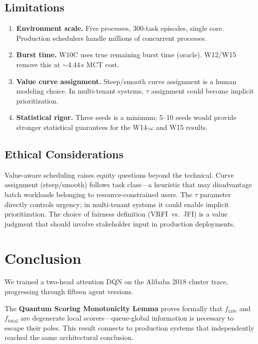 \documentclass[10pt,twocolumn]{article}
\theoremstyle{remark}
\newcommand{\vrfi}{\textsc{VRFI}}
\begin{document}
\subsection{Limitations}

\begin{enumerate}[itemsep=2pt]
\item \textbf{Environment scale.} Five processes, 300-task episodes,
  single core. Production schedulers handle millions of concurrent
  processes.
\item \textbf{Burst time.} W10C uses true remaining burst time
  (oracle). W12/W15 remove this at $\sim$4.44\,s MCT cost.
\item \textbf{Value curve assignment.} Steep/smooth curve assignment
  is a human modeling choice. In multi-tenant systems, $\tau$
  assignment could become implicit prioritization.
\item \textbf{Statistical rigor.} Three seeds is a minimum; 5--10
  seeds would provide stronger statistical guarantees for the W14-$\omega$
  and W15 results.
\end{enumerate}

\subsection{Ethical Considerations}

Value-aware scheduling raises equity questions beyond the technical.
Curve assignment (steep/smooth) follows task class---a heuristic that
may disadvantage batch workloads belonging to resource-constrained
users. The $\tau$ parameter directly controls urgency; in multi-tenant
systems it could enable implicit prioritization. The choice of fairness
definition (\vrfi\ vs.\ JFI) is a value judgment that should involve
stakeholder input in production deployments.

\section{Conclusion}

We trained a two-head attention DQN on the Alibaba 2018 cluster trace,
progressing through fifteen agent versions.

The \textbf{Quantum Scoring Monotonicity Lemma} proves formally that
$f_{\mathrm{rate}}$ and $f_{\mathrm{total}}$ are degenerate local
scorers---queue-global information is necessary to escape their poles.
This result connects to production systems that independently reached
the same architectural conclusion.
\end{document}
